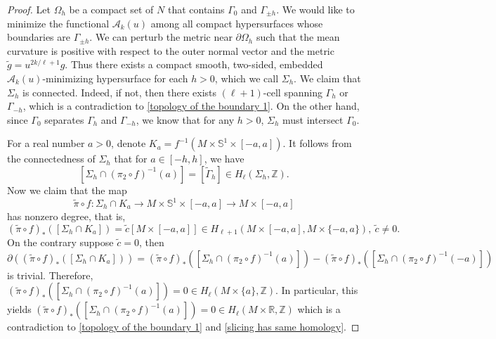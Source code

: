 \documentclass[11pt,letterpaper]{amsart}
\theoremstyle{definition}
\theoremstyle{remark}
\numberwithin{equation}{section}
\begin{document}
\begin{proof}
     
     Let $\Omega_h$ be a compact set of $N$ that contains $\Gamma_0$ and $\Gamma_{\pm h}$. We would like to minimize the functional $\mathcal{A}_k(u)$ among all compact hypersurfaces whose boundaries are $\Gamma_{\pm h}$. We can perturb the metric near $\partial\Omega_h$ such that the mean curvature is positive with respect to the outer normal vector and the metric $\tilde{g}=u^{2k/\ell+1}g.$ Thus there exists a compact smooth, two-sided, embedded $\mathcal{A}_k(u)$-minimizing hypersurface for each $h>0$, which we call $\Sigma_h$. We claim that $\Sigma_h$ is connected. Indeed, if not, then there exists $(\ell+1)$-cell spanning $\Gamma_h$ or $\Gamma_{-h}$, which is a contradiction to \eqref{topology of the boundary 1}. On the other hand, since $\Gamma_0$ separates $\Gamma_h$ and $\Gamma_{-h}$, we know that for any $h>0$, $\Sigma_h$ must intersect $\Gamma_0$.

     For a real number $a>0$, denote $K_{a}=f^{-1}(M\times \mathbb{S}^{1}\times [-a,a])$.
     It follows from  the connectedness of $\Sigma_{h}$ that for $a\in[-h,h]$, we have 
     \begin{equation}\label{slicing has same homology}
         [\Sigma_{h}\cap (\pi_{2}\circ f)^{-1}(a)]=[\tilde{\Gamma}_{h}]\in H_{\ell}(\Sigma_{h},\mathbb{Z}).
     \end{equation}
     Now we claim that the map $$\tilde{\pi}\circ f:\Sigma_{h}\cap K_{a}\rightarrow M\times \mathbb{S}^{1}\times [-a,a]\rightarrow M\times [-a,a]$$ has nonzero degree, that is, $$(\tilde{\pi}\circ f)_{*}([\Sigma_{h}\cap K_{a}])=\tilde{c}[M\times [-a,a]]\in H_{\ell+1}(M\times [-a,a],M\times \{-a,a\}),\ \tilde{c}\neq 0.$$ On the contrary suppose $\tilde{c}=0$, then $$\partial ((\tilde{\pi}\circ f)_{*}([\Sigma_{h}\cap K_{a}]))=(\tilde{\pi}\circ f)_{*}([\Sigma_{h}\cap (\pi_{2}\circ f)^{-1}(a)])-(\tilde{\pi}\circ f)_{*}([\Sigma_{h}\cap (\pi_{2}\circ f)^{-1}(-a)])$$
     is trivial. Therefore, $(\tilde{\pi}\circ f)_{*}([\Sigma_{h}\cap (\pi_{2}\circ f)^{-1}(a)])=0\in H_{\ell}(M\times \{a\},\mathbb{Z})$. In particular, this yields $(\tilde{\pi}\circ f)_{*}([\Sigma_{h}\cap (\pi_{2}\circ f)^{-1}(a)])=0\in H_{\ell}(M\times \mathbb{R},\mathbb{Z})$ which is a contradiction to \eqref{topology of the boundary 1} and \eqref{slicing has same homology}. 
     

\end{proof}
\end{document}
